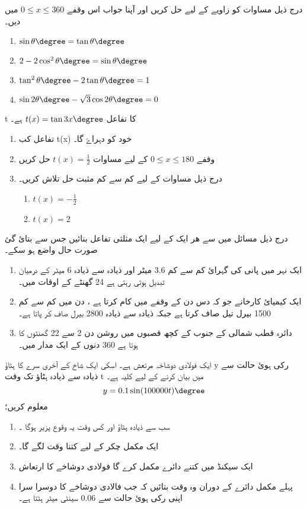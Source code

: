 درج ذیل مساوات کو زاویے کے لیے حل کریں اور آپنا جواب اس وقفے \(0\le x\le 360\)  میں دیں۔
\begin{enumerate}
\item   \(\sin\theta\degree=\tan\theta\degree \)
\item    \(2-2\cos^2\theta\degree=\sin\theta\degree \)
\item     \(\tan^2\theta\degree-2\tan\theta\degree=1 \)
\item    \(\sin2\theta\degree-\sqrt{3}\cos2\theta\degree=0 \)
\end{enumerate}
t 
کا تفاعل \(t(x)=\tan3x\degree \) ہے۔
\begin{enumerate}
\item
تفاعل  کب t(x)  خود  کو  دہراۓ گا۔ 
\item
 وقفے   \(0\leq x\leq180\)  کے لیے  مساوات  \(t(x)=\frac{1}{2} \) حل کریں 
\item
درج ذیل مساوات کے لیے کم سے کم مثبت حل تلاش کریں۔
\begin{enumerate}
\item  \(t(x)=-\frac{1}{2}\)
\item  \(t(x)=2\)
\end{enumerate}

\end{enumerate}



درج ذیل مسائل میں سے ھر ایک کے لیے ایک مثلثی تفاعل بنائیں جس سے بتائ گئ صورت حال واضع ہو سکے۔
\begin{enumerate}
\item
 ایک نہر میں پانی کی گہرائ کم سے کم 3.6 میٹر اور ذیادہ سے ذیادہ 6 میٹر کے درمیان تبدیل ہوتی رہتی ہے 24 گھنٹے کے اوقات میں۔
\item
ایک کیمیائ کارخانے جو کہ دس دن کے وقفے میں کام کرتا ہے ، دن میں کم سے کم 1500 بیرل تیل صاف کرتا ہے جبکہ ذیادہ سے ذیادہ 2800 بیرل صاف کر پاتا ہے۔
\item
دائرہ قطب شمالی کے جنوب کے کچھ قصبوں میں روشن دن 2 سے 22 گھنٹوں کا ہوتا ہے 360 دنوں کے ایک مدار میں۔
\end{enumerate}

ایک فولادی دوشاخہ مرتعش ہے۔ اسکی ایک شاخ کے آخری سرے کا ہٹاؤ  y رکی ہوئ حالت سے ذیادہ سے ذیادہ ہٹاؤ تک وقت t میں بیان کرنے کے لیے کلیہ ہے۔\[y=0.1 \sin(100000t)\degree \]
معلوم کریں؛
\begin{enumerate}
\item سب سے ذیادہ ہٹاؤ اور کس وقت یہ وقوع پزیر ہوگا   ۔
\item     ایک مکمل چکر کے لیے کتنا وقت لگے گا۔
\item    ایک سیکنڈ میں کتنے دائرے مکمل کرے گا فولادی دوشاخے کا  ارتعاش
\item  
 پہلے مکمل دائرے کے دوران وہ وقت بتائیں کہ جب فالادی دوشاخے کا دوسرا سرا اپنی رکی ہوئ حالت سے 0.06 سینٹی میٹر ہٹتا ہے۔ 
\end{enumerate}

